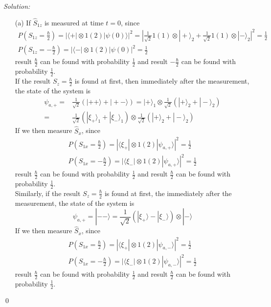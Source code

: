 \documentclass[12pt,a4paper]{article}
\newenvironment{sol}
    {\emph{Solution:}
    }
    {
    \qed
    }
\begin{document}
\begin{sol}
\begin{itemize}
\item[(a)] If $\hat{S}_{1z}$ is measured at time $t=0$, since
\begin{gather}
P(S_{1z}=\frac{\hbar}{2})=|\langle+|\otimes1(2)|\psi(0)\rangle|^2=|\frac{1}{\sqrt{2}}1(1)\otimes|+\rangle_2+\frac{1}{\sqrt{2}}1(1)\otimes|-\rangle_2|^2=\frac{1}{2}\\
P(S_{1z}=-\frac{\hbar}{2})=|\langle-|\otimes1(2)|\psi(0)|^2=\frac{1}{2}
\end{gather}
result $\frac{\hbar}{2}$ can be found with probability $\frac{1}{2}$ and result $-\frac{\hbar}{2}$ can be found with probability $\frac{1}{2}$.\\
If the result $S_z=\frac{\hbar}{2}$ is found at first, then immediately after the measurement, the state of the system is
\begin{align}
\nonumber\psi_{a,+}=&\frac{1}{\sqrt{2}}(|++\rangle+|+-\rangle)=|+\rangle_1\otimes\frac{1}{\sqrt{2}}(|+\rangle_2+|-\rangle_2)\\
=&\frac{1}{\sqrt{2}}(|\xi_+\rangle_1+|\xi_-\rangle_1)\otimes\frac{1}{\sqrt{2}}(|+\rangle_2+|-\rangle_2)
\end{align}
If we then measure $\hat{S}_x$, since
\begin{gather}
P(S_{1x}=\frac{\hbar}{2})=|\langle\xi_+|\otimes1(2)|\psi_{a,+}\rangle|^2=\frac{1}{2}\\
P(S_{1x}=-\frac{\hbar}{2})=|\langle\xi_-|\otimes1(2)|\psi_{a,+}\rangle|^2=\frac{1}{2}
\end{gather}
result $\frac{\hbar}{2}$ can be found with probability $\frac{1}{2}$ and result $\frac{\hbar}{2}$ can be found with probability $\frac{1}{2}$.\\
Similarly, if the result $S_z=\frac{\hbar}{2}$ is found at first, the immediately after the measurement, the state of the system is
\begin{equation}
\psi_{a,+}=|--\rangle=\frac{1}{\sqrt{2}}(|\xi_+\rangle-|\xi_-\rangle)\otimes|-\rangle
\end{equation}
If we then measure $\hat{S}_x$, since
\begin{gather}
P(S_{1x}=\frac{\hbar}{2})=|\langle\xi_+|\otimes1(2)|\psi_{a,-}\rangle|^2=\frac{1}{2}\\
P(S_{1x}=-\frac{\hbar}{2})=|\langle\xi_-|\otimes1(2)|\psi_{a,-}\rangle|^2=\frac{1}{2}
\end{gather}
result $\frac{\hbar}{2}$ can be found with probability $\frac{1}{2}$ and result $\frac{\hbar}{2}$ can be found with probability $\frac{1}{2}$.

\end{itemize}
\end{sol}
\end{document}
